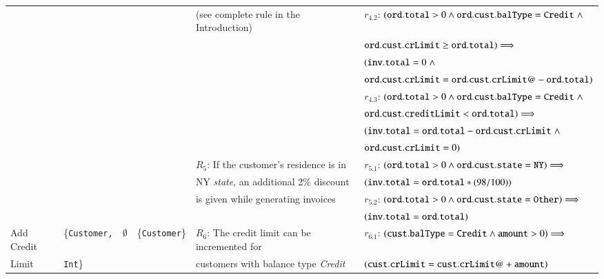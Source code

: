 \begin{table}[t]
{\begin{tabular}{|l|l|l|l|l|l|}
& & & & (see complete rule in the Introduction) &
$r_{4.2}$: $({\tt ord.total} > 0 \wedge {\tt ord.cust.balType} = {\tt Credit} \; \wedge$ \\
& & & & &
\hspace*{10pt}${\tt ord.cust.crLimit} \geq {\tt ord.total}) \Longrightarrow$ \\
& & & & &
\hspace*{10pt}$({\tt inv.total} = 0 \; \wedge$ \\
& & & & &
\hspace*{10pt}${\tt ord.cust.crLimit} = {\tt ord.cust.crLimit@} - {\tt ord.total})$ \\
& & & & &
$r_{4.3}$: $({\tt ord.total} > 0 \wedge {\tt ord.cust.balType} = {\tt Credit} \; \wedge$ \\
& & & & &
\hspace*{10pt}${\tt ord.cust.creditLimit} < {\tt ord.total}) \Longrightarrow$ \\
& & & & &
\hspace*{10pt}$({\tt inv.total} = {\tt ord.total} - {\tt ord.cust.crLimit} \; \wedge$ \\
& & & & &
\hspace*{10pt}${\tt ord.cust.crLimit} = 0)$ \\
\cline{5-6}
& & & & $R_5$: If the customer's residence is in &
$r_{5.1}$: $({\tt ord.total} > 0 \wedge {\tt ord.cust.state} = {\tt NY})
\Longrightarrow$ \\ 
& & & & NY \textit{state}, an additional 2\% discount &
\hspace*{10pt}$({\tt inv.total} = {\tt ord.total} * (98 / 100))$ \\ 
& & & & is given while generating invoices &
$r_{5.2}$: $({\tt ord.total} > 0 \wedge {\tt ord.cust.state} = {\tt Other})
\Longrightarrow$ \\
& & & & &
\hspace*{10pt}$({\tt inv.total} = {\tt ord.total})$ \\
\hline
Add Credit & \{{\tt Customer,} & \multicolumn{1}{|c|}{$\emptyset$} &
\{{\tt Customer}\} &
$R_6$: The credit limit can be incremented for &
$r_{6.1}$: $({\tt cust.balType} = {\tt Credit} \wedge {\tt amount} > 0) \Longrightarrow$ \\
Limit & {\tt Int}\} & & & customers with balance type \textit{Credit} &
\hspace*{10pt}$({\tt cust.crLimit} = {\tt cust.crLimit@} + {\tt amount})$\\
\hline

\end{tabular}}
\end{table}
